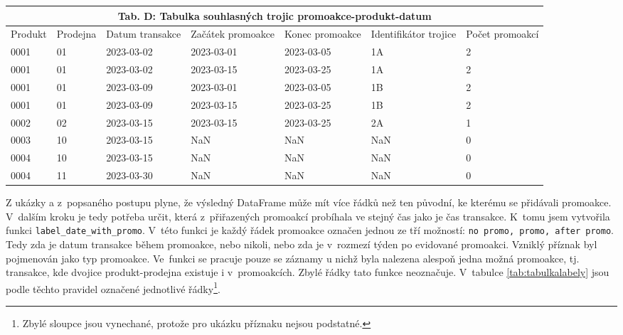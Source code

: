 \begin{table}[hbtp!]
\begin{tabular}{llp{2cm}p{2.2cm}p{2cm}p{2cm}}
    \end{tabular}
\bigskip
    \begin{tabular}{llp{2cm}p{2cm}p{2.1cm}p{2cm}p{2cm}}
        \multicolumn{7}{c}{Tab. D: Tabulka souhlasných trojic promoakce-produkt-datum} \\
        \toprule
        Produkt & Prodejna & Datum transakce & Začátek promoakce & Konec \newline promoakce& Identifikátor trojice & Počet \newline promoakcí\\
        \midrule
        0001 & 01 & 2023-03-02 & 2023-03-01 & 2023-03-05 & 1A & 2 \\
        0001 & 01 & 2023-03-02 & 2023-03-15 & 2023-03-25 & 1A & 2 \\
        0001 & 01 & 2023-03-09 & 2023-03-01 & 2023-03-05 & 1B & 2 \\
        0001 & 01 & 2023-03-09 & 2023-03-15 & 2023-03-25 & 1B & 2 \\
        0002 & 02 & 2023-03-15 & 2023-03-15 & 2023-03-25 & 2A & 1 \\
        0003 & 10 & 2023-03-15 & NaN & NaN & NaN & 0 \\
        0004 & 10 & 2023-03-15 & NaN & NaN & NaN & 0 \\
        0004 & 11 & 2023-03-30 & NaN& NaN & NaN & 0 \\
        \bottomrule
    \end{tabular}
    \label{tab:tabulkypromoakceukaz}
\end{table}

Z ukázky a z~popsaného postupu plyne, že výsledný DataFrame může mít více řádků než ten původní, ke kterému se přidávali promoakce. V~dalším kroku je tedy potřeba určit, která z~přiřazených promoakcí probíhala ve stejný čas jako je čas transakce. K~tomu jsem vytvořila funkci \texttt{label\_date\_with\_promo}. V~této funkci je každý řádek promoakce označen jednou ze tří možností: \texttt{no promo, promo, after promo}. Tedy zda je datum transakce během promoakce, nebo nikoli, nebo zda je v~rozmezí týden po evidované promoakci. Vzniklý příznak byl pojmenován jako typ promoakce. Ve~funkci se pracuje pouze se záznamy u nichž byla nalezena alespoň jedna možná promoakce, tj. transakce, kde dvojice produkt-prodejna existuje i v~promoakcích. Zbylé řádky tato funkce neoznačuje. V~tabulce \ref*{tab:tabulkalabely} jsou podle těchto pravidel označené jednotlivé řádky\footnote[1]{Zbylé sloupce jsou vynechané, protože pro ukázku příznaku nejsou podstatné.}.
 
